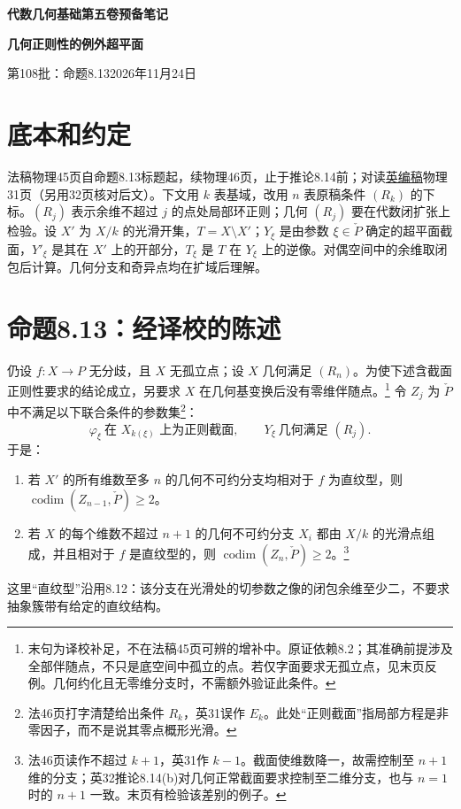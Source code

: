 \documentclass[openany,fontset=fandol]{ctexbook}
\newcommand{\PD}{\check P}
\newcommand{\cod}{\operatorname{codim}}
\begin{document}
\begin{center}
{\Large\bfseries 代数几何基础第五卷预备笔记}\par\medskip
{\LARGE\bfseries 几何正则性的例外超平面}\par\medskip
第108批：命题8.13\quad 2026年11月24日
\end{center}

\section*{底本和约定}
法稿物理45页自命题8.13标题起，续物理46页，止于推论8.14前；对读\href{https://webusers.imj-prg.fr/~leila.schneps/grothendieckcircle/EGA/EGA5trans.pdf}{英编稿}物理31页（另用32页核对后文）。下文用 $k$ 表基域，改用 $n$ 表原稿条件 $(R_k)$ 的下标。$(R_j)$ 表示余维不超过 $j$ 的点处局部环正则；几何 $(R_j)$ 要在代数闭扩张上检验。设 $X'$ 为 $X/k$ 的光滑开集，$T=X\setminus X'$；$Y_\xi$ 是由参数 $\xi\in\PD$ 确定的超平面截面，$Y'_\xi$ 是其在 $X'$ 上的开部分，$T_\xi$ 是 $T$ 在 $Y_\xi$ 上的逆像。对偶空间中的余维取闭包后计算。几何分支和奇异点均在扩域后理解。

\section*{命题8.13：经译校的陈述}
仍设 $f:X\to P$ 无分歧，且 $X$ 无孤立点；设 $X$ 几何满足 $(R_n)$。为使下述含截面正则性要求的结论成立，另要求 $X$ 在几何基变换后没有零维伴随点。\footnote{末句为译校补足，不在法稿45页可辨的增补中。原证依赖8.2；其准确前提涉及全部伴随点，不只是底空间中孤立的点。若仅字面要求无孤立点，见末页反例。几何约化且无零维分支时，不需额外验证此条件。}
令 $Z_j$ 为 $\PD$ 中不满足以下联合条件的参数集\footnote{法46页打字清楚给出条件 $R_k$，英31误作 $E_k$。此处“正则截面”指局部方程是非零因子，而不是说其零点概形光滑。}：
\[
 \varphi_\xi\ \text{在 }X_{k(\xi)}\text{ 上为正则截面},
 \qquad Y_\xi\ \text{几何满足 }(R_j).
\]
于是：
\begin{enumerate}
\item[(a)] 若 $X'$ 的所有维数至多 $n$ 的几何不可约分支均相对于 $f$ 为直纹型，则 $\cod(Z_{n-1},\PD)\ge2$。
\item[(b)] 若 $X$ 的每个维数不超过 $n+1$ 的几何不可约分支 $X_i$ 都由 $X/k$ 的光滑点组成，并且相对于 $f$ 是直纹型的，则 $\cod(Z_n,\PD)\ge2$。\footnote{法46页读作不超过 $k+1$，英31作 $k-1$。截面使维数降一，故需控制至 $n+1$ 维的分支；英32推论8.14(b)对几何正常截面要求控制至二维分支，也与 $n=1$ 时的 $n+1$ 一致。末页有检验该差别的例子。}
\end{enumerate}
这里“直纹型”沿用8.12：该分支在光滑处的切参数之像的闭包余维至少二，不要求抽象簇带有给定的直纹结构。
\end{document}
